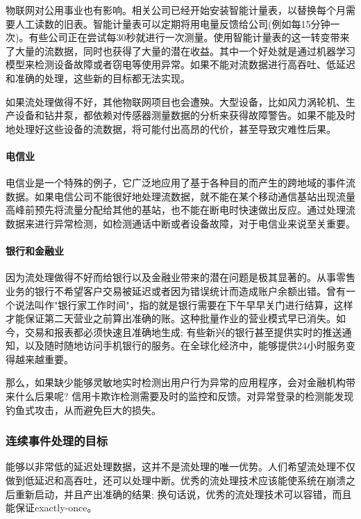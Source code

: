 \documentclass{ctexart}
\begin{document}
物联网对公用事业也有影响。相关公司已经开始安装智能计量表，以替换每个月需要人工读数的旧表。智能计量表可以定期将用电量反馈给公司(例如每15分钟一次)。有些公司正在尝试每30秒就进行一次测量。使用智能计量表的这一转变带来了大量的流数据，同时也获得了大量的潜在收益。其中一个好处就是通过机器学习模型来检测设备故障或者窃电等使用异常。如果不能对流数据进行高吞吐、低延迟和准确的处理，这些新的目标都无法实现。

如果流处理做得不好，其他物联网项目也会遭殃。大型设备，比如风力涡轮机、生产设备和钻井泵，都依赖对传感器测量数据的分析来获得故障警告。如果不能及时地处理好这些设备的流数据，将可能付出高昂的代价，甚至导致灾难性后果。

\paragraph{电信业}

电信业是一个特殊的例子，它广泛地应用了基于各种目的而产生的跨地域的事件流数据。如果电信公司不能很好地处理流数据，就不能在某个移动通信基站出现流量高峰前预先将流量分配给其他的基站，也不能在断电时快速做出反应。通过处理流数据来进行异常检测，如检测通话中断或者设备故障，对于电信业来说至关重要。

\paragraph{银行和金融业}

因为流处理做得不好而给银行以及金融业带来的潜在问题是极其显著的。从事零售业务的银行不希望客户交易被延迟或者因为错误统计而造成账户余额出错。曾有一个说法叫作"银行家工作时间"，指的就是银行需要在下午早早关门进行结算，这样才能保证第二天营业之前算出准确的账。这种批量作业的营业模式早已消失。如今，交易和报表都必须快速且准确地生成; 有些新兴的银行甚至提供实时的推送通知，以及随时随地访问手机银行的服务。在全球化经济中，能够提供24小时服务变得越来越重要。

那么，如果缺少能够灵敏地实时检测出用户行为异常的应用程序，会对金融机构带来什么后果呢? 信用卡欺诈检测需要及时的监控和反馈。对异常登录的检测能发现钓鱼式攻击，从而避免巨大的损失。

\subsubsection{连续事件处理的目标}

能够以非常低的延迟处理数据，这并不是流处理的唯一优势。人们希望流处理不仅做到低延迟和高吞吐，还可以处理中断。优秀的流处理技术应该能使系统在崩溃之后重新启动，并且产出准确的结果; 换句话说，优秀的流处理技术可以容错，而且能保证exactly-once。
\end{document}

